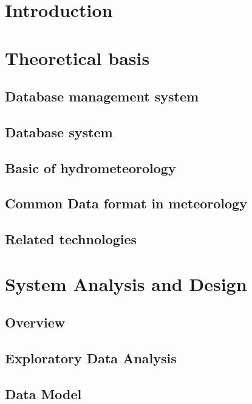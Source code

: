 \documentclass[12pt, a4paper]{report}
\begin{document}
\listoffigures
\listoftables


\chapter{Introduction}


\newpage

\chapter{Theoretical basis}
\section{Database management system}

\section{Database system}

\section{Basic of hydrometeorology}

\section{Common Data format in meteorology}

\section{Related technologies}


\newpage
\chapter{System Analysis and Design}
\section{Overview}

\section{Exploratory Data Analysis}

\section{Data Model}

\end{document}
